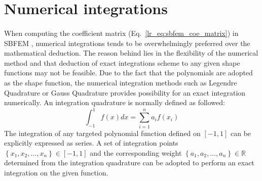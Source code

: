\section{Numerical integrations}
\label{iso_section:numerical_integration}
\paragraph{}
When computing the coefficient matrix (Eq.~\ref{lr_eq:sbfem_coe_matrix}) in SBFEM , numerical integrations tends to be overwhelmingly preferred over the mathematical deduction.
The reason behind lies in the flexibility of the numerical method and that deduction of exact integrations scheme to any given shape functions may not be feasible. 
Due to the fact that the polynomials are adopted as the shape function, the numerical integration methods such as Legendre Quadrature or Gauss Quadrature provides possibility for an exact integration numerically.
An integration quadrature is normally defined as followed:
    \begin{equation}
        \int_{-1}^{1}
        f(x)dx 
        = \sum_{i=1}^n
        a_i f(x_i)
    \label{iso_eq:numerical_integration}
    \end{equation}
%
The integration of any targeted polynomial function defined on $[-1,1]$ can be explicitly expressed as series.
A set of integration points $\left\{ x_1, x_2, \dots, x_n \right\} \in \left[-1,1\right]$ and the corresponding weight $\left\{ a_1, a_2, \dots, a_n \right\} \in \mathbb{R}$ determined from the integration quadrature can be adopted to perform an exact integration on the given function.
